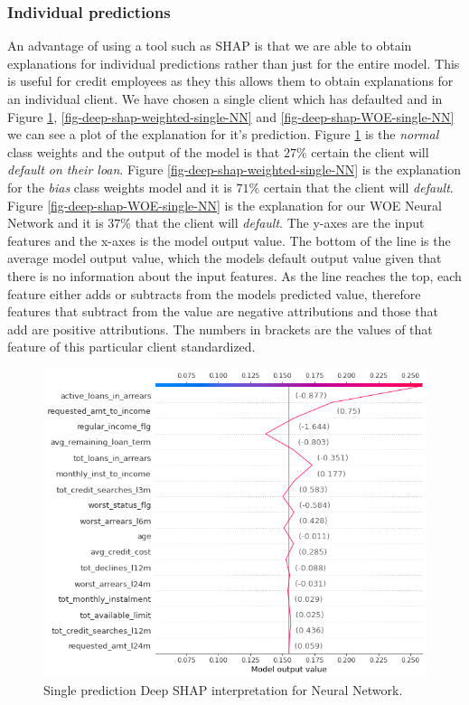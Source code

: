 \subsubsection{Individual predictions}
An advantage of using a tool such as SHAP is that we are able to obtain explanations for individual predictions rather than just for the entire model. This is useful for credit employees as they this allows them to obtain explanations for an individual client. We have chosen a single client which has defaulted and in Figure \ref{fig-deep-shap-single-NN}, \ref{fig-deep-shap-weighted-single-NN} and \ref{fig-deep-shap-WOE-single-NN} we can see a plot of the explanation for it's prediction. Figure \ref{fig-deep-shap-single-NN} is the \emph{normal} class weights and the output of the model is that $27\%$ certain the client will \emph{default on their loan}. Figure \ref{fig-deep-shap-weighted-single-NN} is the explanation for the \emph{bias} class weights model and it is $71\%$ certain that the client will \emph{default}. Figure \ref{fig-deep-shap-WOE-single-NN} is the explanation for our WOE Neural Network and it is $37\%$ that the client will \emph{default}. The y-axes are the input features and the x-axes is the model output value. The bottom of the line is the average model output value, which the models default output value given that there is no information about the input features. As the line reaches the top, each feature either adds or subtracts from the models predicted value, therefore features that subtract from the value are negative attributions and those that add are positive attributions. The numbers in brackets are the values of that feature of this particular client standardized.

\begin  {figure}[!htpb]
\centering
  \includegraphics[width=0.8\linewidth]{Credit_Images/shap-nn-single.png}
   \caption{Single prediction Deep SHAP interpretation for Neural Network.}
    \label{fig-deep-shap-single-NN}
\end{figure}

